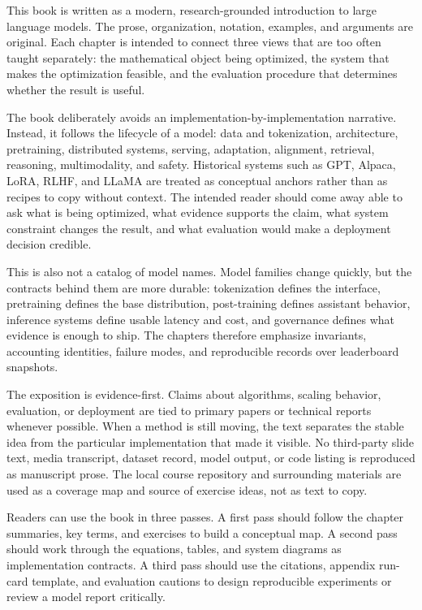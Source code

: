 %
\preface

This book is written as a modern, research-grounded introduction to large language models. The prose, organization, notation, examples, and arguments are original. Each chapter is intended to connect three views that are too often taught separately: the mathematical object being optimized, the system that makes the optimization feasible, and the evaluation procedure that determines whether the result is useful.

The book deliberately avoids an implementation-by-implementation narrative. Instead, it follows the lifecycle of a model: data and tokenization, architecture, pretraining, distributed systems, serving, adaptation, alignment, retrieval, reasoning, multimodality, and safety. Historical systems such as GPT, Alpaca, LoRA, RLHF, and LLaMA are treated as conceptual anchors rather than as recipes to copy without context. The intended reader should come away able to ask what is being optimized, what evidence supports the claim, what system constraint changes the result, and what evaluation would make a deployment decision credible.

This is also not a catalog of model names. Model families change quickly, but the contracts behind them are more durable: tokenization defines the interface, pretraining defines the base distribution, post-training defines assistant behavior, inference systems define usable latency and cost, and governance defines what evidence is enough to ship. The chapters therefore emphasize invariants, accounting identities, failure modes, and reproducible records over leaderboard snapshots.

The exposition is evidence-first. Claims about algorithms, scaling behavior, evaluation, or deployment are tied to primary papers or technical reports whenever possible. When a method is still moving, the text separates the stable idea from the particular implementation that made it visible. No third-party slide text, media transcript, dataset record, model output, or code listing is reproduced as manuscript prose. The local course repository and surrounding materials are used as a coverage map and source of exercise ideas, not as text to copy.

Readers can use the book in three passes. A first pass should follow the chapter summaries, key terms, and exercises to build a conceptual map. A second pass should work through the equations, tables, and system diagrams as implementation contracts. A third pass should use the citations, appendix run-card template, and evaluation cautions to design reproducible experiments or review a model report critically.
